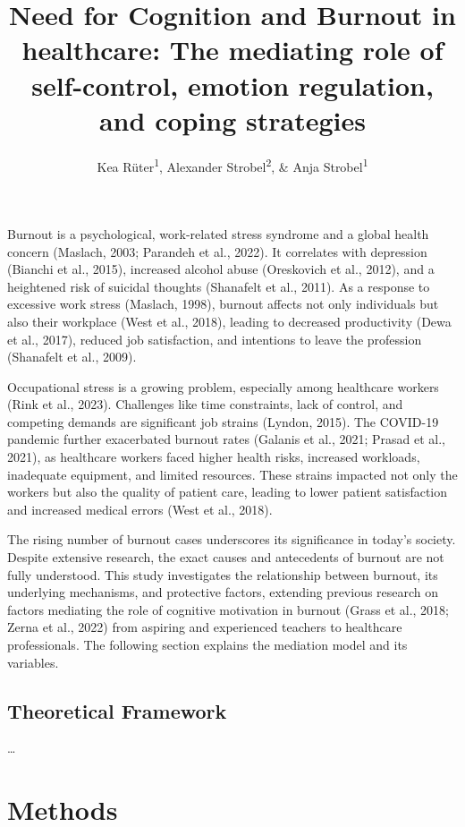 \documentclass[
  man]{apa6}
\title{Need for Cognition and Burnout in healthcare: The mediating role of self-control, emotion regulation, and coping strategies}
\author{Kea Rüter\textsuperscript{1}, Alexander Strobel\textsuperscript{2}, \& Anja Strobel\textsuperscript{1}}
\date{}
\affiliation{\vspace{0.5cm}\textsuperscript{1} Department of Psychology, Technische Universität Chemnitz, Chemnitz, Germany\\\textsuperscript{2} Faculty of Psychology, Technische Universität Dresden, Dresden, Germany}
\begin{document}
\maketitle

Burnout is a psychological, work-related stress syndrome and a global health concern (Maslach, 2003; Parandeh et al., 2022).
It correlates with depression (Bianchi et al., 2015), increased alcohol abuse (Oreskovich et al., 2012), and a heightened risk of suicidal thoughts (Shanafelt et al., 2011).
As a response to excessive work stress (Maslach, 1998), burnout affects not only individuals but also their workplace (West et al., 2018), leading to decreased productivity (Dewa et al., 2017), reduced job satisfaction, and intentions to leave the profession (Shanafelt et al., 2009).

Occupational stress is a growing problem, especially among healthcare workers (Rink et al., 2023).
Challenges like time constraints, lack of control, and competing demands are significant job strains (Lyndon, 2015).
The COVID-19 pandemic further exacerbated burnout rates (Galanis et al., 2021; Prasad et al., 2021), as healthcare workers faced higher health risks, increased workloads, inadequate equipment, and limited resources.
These strains impacted not only the workers but also the quality of patient care, leading to lower patient satisfaction and increased medical errors (West et al., 2018).

The rising number of burnout cases underscores its significance in today's society.
Despite extensive research, the exact causes and antecedents of burnout are not fully understood.
This study investigates the relationship between burnout, its underlying mechanisms, and protective factors, extending previous research on factors mediating the role of cognitive motivation in burnout (Grass et al., 2018; Zerna et al., 2022) from aspiring and experienced teachers to healthcare professionals.
The following section explains the mediation model and its variables.

\subsection{Theoretical Framework}\label{theoretical-framework}

\ldots{}

\section{Methods}\label{methods}
\end{document}
